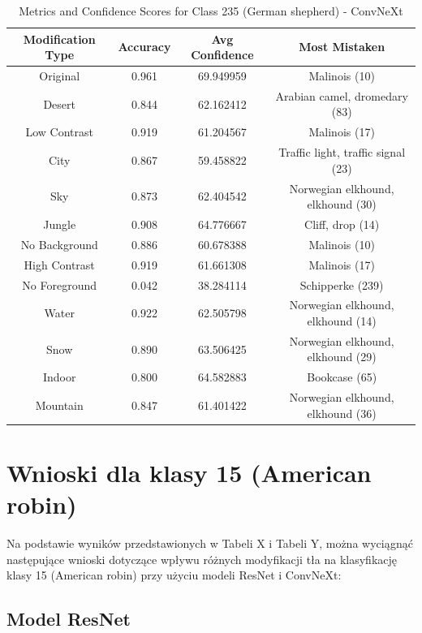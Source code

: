 \begin{table}
	\centering
	\begin{tabular}{|c|c|c|c|}
		\hline
		\textbf{Modification Type} & \textbf{Accuracy} & \textbf{Avg Confidence} & \textbf{Most Mistaken} \\
		\hline
		Original & 0.961 & 69.949959 & Malinois (10) \\
		\hline
		Desert & 0.844 & 62.162412 & Arabian camel, dromedary (83) \\
		\hline
		Low Contrast & 0.919 & 61.204567 & Malinois (17) \\
		\hline
		City & 0.867 & 59.458822 & Traffic light, traffic signal (23) \\
		\hline
		Sky & 0.873 & 62.404542 & Norwegian elkhound, elkhound (30) \\
		\hline
		Jungle & 0.908 & 64.776667 & Cliff, drop (14) \\
		\hline
		No Background & 0.886 & 60.678388 & Malinois (10) \\
		\hline
		High Contrast & 0.919 & 61.661308 & Malinois (17) \\
		\hline
		No Foreground & 0.042 & 38.284114 & Schipperke (239) \\
		\hline
		Water & 0.922 & 62.505798 & Norwegian elkhound, elkhound (14) \\
		\hline
		Snow & 0.890 & 63.506425 & Norwegian elkhound, elkhound (29) \\
		\hline
		Indoor & 0.800 & 64.582883 & Bookcase (65) \\
		\hline
		Mountain & 0.847 & 61.401422 & Norwegian elkhound, elkhound (36) \\
		\hline
	\end{tabular}
	\caption{Metrics and Confidence Scores for Class 235 (German shepherd) - ConvNeXt}
	\label{tab:metrics_confidence_class_235_convnext}
\end{table}

\section*{Wnioski dla klasy 15 (American robin)}

Na podstawie wyników przedstawionych w Tabeli X i Tabeli Y, można wyciągnąć następujące wnioski dotyczące wpływu różnych modyfikacji tła na klasyfikację klasy 15 (American robin) przy użyciu modeli ResNet i ConvNeXt:

\subsection*{Model ResNet}

